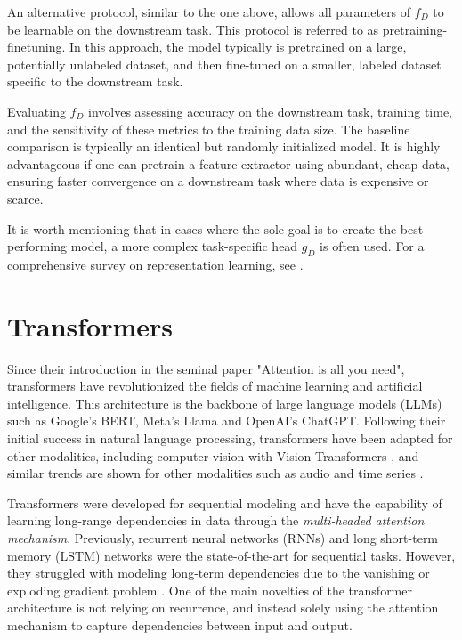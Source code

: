 \documentclass[../../thesis.tex]{subfiles}
\begin{document}
An alternative protocol, similar to the one above, allows all parameters of $f_D$ to be learnable on the downstream task. This protocol is referred to as pretraining-finetuning. In this approach, the model typically is pretrained on a large, potentially unlabeled dataset, and then fine-tuned on a smaller, labeled dataset specific to the downstream task. \newline

Evaluating $f_D$ involves assessing accuracy on the downstream task, training time, and the sensitivity of these metrics to the training data size. The baseline comparison is typically an identical but randomly initialized model. It is highly advantageous if one can pretrain a feature extractor using abundant, cheap data, ensuring faster convergence on a downstream task where data is expensive or scarce.\newline

It is worth mentioning that in cases where the sole goal is to create the best-performing model, a more complex task-specific head $g_D$ is often used. For a comprehensive survey on representation learning, see \cite{nozawa2022empirical}.



\section{Transformers}

Since their introduction in the seminal paper "Attention is all you need"\cite{vaswani2023attention}, transformers have revolutionized the fields of machine learning and artificial intelligence. This architecture is the backbone of large language models (LLMs) such as Google's BERT, Meta's Llama and OpenAI's ChatGPT. Following their initial success in natural language processing, transformers have been adapted for other modalities, including computer vision with Vision Transformers \cite{dosovitskiy2021image}, and similar trends are shown for other modalities such as audio \cite{latif2023transformers} and time series \cite{wen2023transformers}. \newline

Transformers were developed for sequential modeling and have the capability of learning long-range dependencies in data through the \textit{multi-headed attention mechanism}.  Previously, recurrent neural networks (RNNs) and long short-term memory (LSTM) networks were the state-of-the-art for sequential tasks. However, they struggled with modeling long-term dependencies due to the vanishing or exploding gradient problem \cite{279181}. One of the main novelties of the transformer architecture is not relying on recurrence, and instead solely using the attention mechanism to capture dependencies between input and output.
\newline
\end{document}
